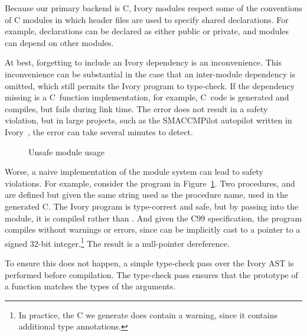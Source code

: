 Because our primary backend is C, Ivory modules respect some of the conventions
of C modules in which header files are used to specify shared declarations. For
example, declarations can be declared as either public or private, and modules
can depend on other modules.


At best, forgetting to include an Ivory dependency is an inconvenience. This
inconvenience can be substantial in the case that an inter-module dependency is
omitted, which still permits the Ivory program to type-check. If the dependency
missing is a C~function implementation, for example, C~code is generated and
compiles, but fails during link time. The error does not result in a safety
violation, but in large projects, such as the SMACCMPilot autopilot written in
Ivory~\cite{smaccm}, the error can take several minutes to detect.

\begin{figure}[t]
\caption{Unsafe module usage}
\label{fig:unsafe-module}
\end{figure}

Worse, a naive implementation of the module system can lead to safety
violations. For example, consider the program in
Figure~\ref{fig:unsafe-module}. Two procedures,  and 
are defined but given the same string used as the procedure name, used in the
generated C. The Ivory program is type-correct and safe, but by passing
 into the module, it is compiled rather than . And given
the C99 specification, the program compiles without warnings or errors, since
 can be implicitly cast to a pointer to a signed 32-bit
integer.\footnote{In practice, the C we generate does contain a warning, since
  it contains additional type annotations.} The result is a
null-pointer dereference.

To ensure this does not happen, a simple type-check pass over the Ivory AST is
performed before compilation. The type-check pass ensures that the prototype of
a function matches the types of the arguments.
